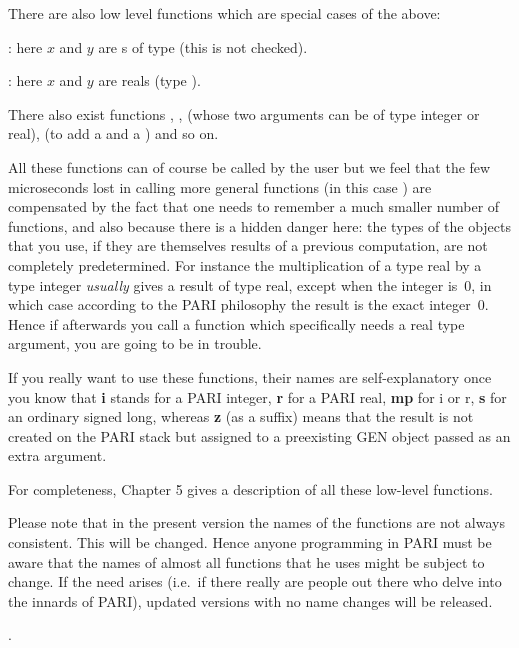 
\noindent There are also low level functions which are special cases of the
above:

: here $x$ and $y$ are s of type
 (this is not checked).

: here $x$ and $y$ are  reals
(type ).

\noindent
There also exist functions , ,  (whose
two arguments can be of type integer or real),  (to add a 
and a ) and so on.

All these functions can of course be called by the user but we feel that
the few microseconds lost in calling more general functions (in this case
) are compensated by the fact that one needs to remember a much
smaller number of functions, and also because there is a hidden danger here:
the types of the objects that you use, if they are themselves results of a
previous computation, are not completely predetermined. For instance the
multiplication of a type real  by a type integer 
{\it usually\/} gives a result of type real, except when the integer is~0, in
which case according to the PARI philosophy the result is the exact integer~0.
Hence if afterwards you call a function which specifically needs a real
type argument, you are going to be in trouble.

If you really want to use these functions, their names are self-explanatory
once you know that {\bf i} stands for a PARI integer, {\bf r} for a PARI
real, {\bf mp} for i or r, {\bf s} for an ordinary signed long, whereas {\bf
z} (as a suffix) means that the result is not created on the PARI
stack but assigned to a preexisting GEN object passed as an extra argument.

For completeness, Chapter 5 gives a description of all these
low-level functions.

Please note that in the present version \vers{} the names of the functions
are not always consistent. This will be changed. Hence anyone programming in
PARI must be aware that the names of almost all functions that he uses might
be subject to change. If the need arises (i.e.~if there really are people out
there who delve into the innards of PARI), updated versions with no name
changes will be released.

.


